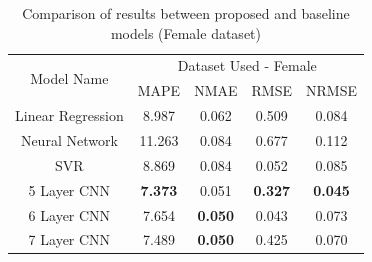 \begin{table}[]
\centering
\caption{Comparison of results between proposed and baseline models (Female dataset)}
\label{femalecomp}
\begin{tabular}{|c|c|c|c|c|}
\hline
\multirow{2}{*}{Model Name} & \multicolumn{4}{c|}{Dataset Used - Female}                                                                              \\ \cline{2-5} 
                            & \multicolumn{1}{l|}{MAPE} & \multicolumn{1}{l|}{NMAE} & \multicolumn{1}{l|}{RMSE} & \multicolumn{1}{l|}{NRMSE} \\ \hline
Linear Regression            & 8.987                     & 0.062                     & 0.509                     & 0.084                      \\ \hline
Neural Network              & 11.263                    & 0.084                     & 0.677                     & 0.112                      \\ \hline
SVR                         & 8.869                     & 0.084                     & 0.052                     & 0.085                      \\ \hline
5 Layer CNN                 & \textbf{7.373}            & 0.051                     & \textbf{0.327}            & \textbf{0.045}             \\ \hline
6 Layer CNN                 & 7.654                     & \textbf{0.050}            & 0.043                     & 0.073                      \\ \hline
7 Layer CNN                 & 7.489                     & \textbf{0.050}            & 0.425                     & 0.070                      \\ \hline
\end{tabular}
\end{table}

